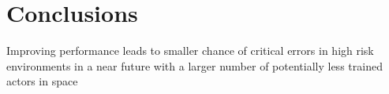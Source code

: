 \documentclass[float=false, crop=false]{standalone}
\begin{document}
\section{Conclusions}
Improving performance leads to smaller chance of critical errors in high risk environments in a near future with a larger number of potentially less trained actors in space
\end{document}
